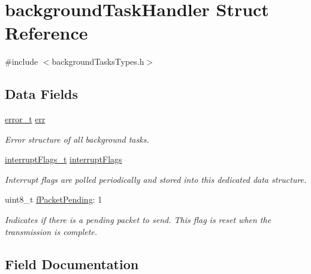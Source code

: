\hypertarget{structbackground_task_handler}{}\section{background\+Task\+Handler Struct Reference}
\label{structbackground_task_handler}


{\ttfamily \#include $<$background\+Tasks\+Types.\+h$>$}

\subsection*{Data Fields}
\begin{DoxyCompactItemize}
\item 
\mbox{\hyperlink{group__error_gad3ae44be85fe6952dcaed425499e8f6b}{error\+\_\+t}} \mbox{\hyperlink{structbackground_task_handler_a79e8f977787d9fccf257bbbccaaf3522}{err}}
\begin{DoxyCompactList}\small\item\em Error structure of all background tasks. \end{DoxyCompactList}\item 
\mbox{\hyperlink{group__interrupts_ga337298055be267e726930c9fc6b2d4eb}{interrupt\+Flags\+\_\+t}} \mbox{\hyperlink{structbackground_task_handler_a58c597d1c6de0f01d960436216389529}{interrupt\+Flags}}
\begin{DoxyCompactList}\small\item\em Interrupt flags are polled periodically and stored into this dedicated data structure. \end{DoxyCompactList}\item 
uint8\+\_\+t \mbox{\hyperlink{structbackground_task_handler_a55a5ad03a1e3f5808b419c49021b4759}{f\+Packet\+Pending}}\+: 1
\begin{DoxyCompactList}\small\item\em Indicates if there is a pending packet to send. This flag is reset when the transmission is complete. \end{DoxyCompactList}\end{DoxyCompactItemize}


\subsection{Field Documentation}
\mbox{\label{structbackground_task_handler_a79e8f977787d9fccf257bbbccaaf3522}} 
